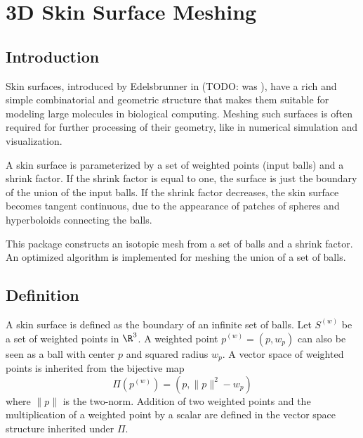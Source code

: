 
\chapter{3D Skin Surface Meshing}
\label{chapterSkinSurface}

\minitoc

\section{Introduction}
\label{sectionSkinSurfaceIntro}

Skin surfaces, introduced by Edelsbrunner in \cite{e-dssd-99} (TODO: was
\cite{e-dssd-98}), have a rich and simple combinatorial and geometric
structure that makes them suitable for modeling large molecules in
biological computing.  Meshing such surfaces is often required for
further processing of their geometry, like in numerical simulation and
visualization.

A skin surface is parameterized by a set of weighted points (input
balls) and a shrink factor. If the shrink factor is equal to one, the
surface is just the boundary of the union of the input balls.  If the
shrink factor decreases, the skin surface becomes tangent continuous,
due to the appearance of patches of spheres and hyperboloids
connecting the balls.

This package constructs an isotopic mesh from a set of balls and a
shrink factor. An optimized algorithm is implemented for meshing the
union of a set of balls.

\section{Definition}
A skin surface is defined as the boundary of an infinite set of balls.
Let ${S}^{(w)}$ be a set of weighted points in $\R^3$. A weighted
point ${p}^{(w)}=(p,w_p)$ can also be seen as a ball with center $p$
and squared radius $w_p$. A vector space of weighted points is
inherited from the bijective map
\[\Pi({p}^{(w)}) = ({p, \|{p}\|^2-w_p})\]
where $\|{p}\|$ is the two-norm. Addition of two weighted points and
the multiplication of a weighted point by a scalar are defined in the
vector space structure inherited under $\Pi$.

